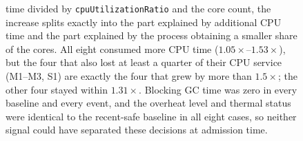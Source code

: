 \begin{figure}[!t]
{    time divided by \texttt{cpuUtilizationRatio} and the core count, the
    increase splits exactly into the part explained by additional CPU time and
    the part explained by the process obtaining a smaller share of the cores.
    All eight consumed more CPU time ($1.05\times$--$1.53\times$), but the four
    that also lost at least a quarter of their CPU service (M1--M3, S1) are
    exactly the four that grew by more than $1.5\times$; the other four stayed
    within $1.31\times$.  Blocking GC time was zero in every baseline and every
    event, and the overheat level and thermal status were identical to the
    recent-safe baseline in all eight cases, so neither signal could have
    separated these decisions at admission time.}
    \ifdefined\rqtwoUnsafeSpikeSideBySide
      \label{fig:rq2_unsafe_spike_anatomy_side_by_side}
    \else
      \label{fig:rq2_unsafe_spike_anatomy}
    \fi
  \fi
\end{figure}
\endgroup
